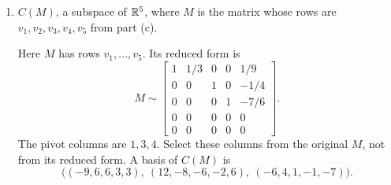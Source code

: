\begin{enumerate}[label=\alph*)]
\begin{answer}
For the five given vectors,
\[
\begin{gathered}
 v_1=(-9,-3,12,-6,3),\quad v_2=(6,2,-8,4,-2),\\
 v_3=(6,2,-6,1,1),\quad v_4=(3,1,-2,-1,2),\quad v_5=(3,1,6,-7,7),
\end{gathered}
\]
we have $v_2=-\frac23v_1$ and $v_4=\frac13v_1+v_3$.
Thus $V_3=\langle v_1,v_3,v_5\rangle$.
These three vectors are independent: the minor formed by their coordinates
$1,3,4$ is
\[
 \det\begin{bmatrix}-9&6&3\\12&-6&6\\-6&1&-7\end{bmatrix}=-108\ne0.
\]
Hence $(v_1,v_3,v_5)$ is a basis of $V_3$.
\end{answer}

\item $C(M)$, a subspace of $\mathbb R^5$, where $M$ is the matrix whose rows are $v_1,v_2,v_3,v_4,v_5$ from part (c).

\begin{answer}
Here $M$ has rows $v_1,\ldots,v_5$. Its reduced form is
\[
 M\sim\begin{bmatrix}
 1&1/3&0&0&1/9\\0&0&1&0&-1/4\\0&0&0&1&-7/6\\
 0&0&0&0&0\\0&0&0&0&0
 \end{bmatrix}.
\]
The pivot columns are $1,3,4$. Select these columns from the original $M$,
not from its reduced form. A basis of $C(M)$ is
\[
 \bigl((-9,6,6,3,3),\ (12,-8,-6,-2,6),\ (-6,4,1,-1,-7)\bigr).
\]
\end{answer}
\end{enumerate}

